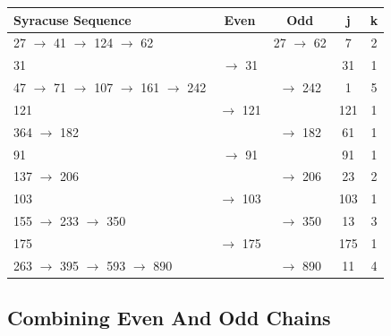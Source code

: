\documentclass[letterpaper]{article}
\begin{document}
\begin{multicols}{2}
    \noindent
    \begin{minipage}{\columnwidth}
        \setlength{\tabcolsep}{.35\tabcolsep}
        \centering
        \begin{tabular}{|l|c|c|c|c|}
            \hline
            \textbf{Syracuse Sequence}                      & \textbf{Even} & \textbf{Odd} & \textbf{j} & \textbf{k}  \\
            \hline
            27 $\to$ 41 $\to$ 124 $\to$ 62                  &               & 27 $\to$ 62  & 7          & 2           \\
            \hline
            31                                        & $\to$ 31      &              & 31         & 1               \\
            \hline
            47 $\to$ 71 $\to$ 107 $\to$ 161 $\to$ 242 &               & $\to$ 242    & 1          & 5            \\
            \hline
            121                                       & $\to$ 121     &              & 121        & 1           \\
            \hline
            364 $\to$ 182                             &               & $\to$ 182    & 61         & 1            \\
            \hline
            91                                        & $\to$ 91      &              & 91         & 1         \\
            \hline
            137 $\to$ 206                             &               & $\to$ 206    & 23         & 2              \\
            \hline
             103                                       & $\to$ 103     &              & 103        & 1             \\
            \hline
            155 $\to$ 233 $\to$ 350                   &               & $\to$ 350    & 13         & 3           \\
            \hline
            175                                       & $\to$ 175     &              & 175        & 1            \\
            \hline
            263 $\to$ 395 $\to$ 593 $\to$ 890         &               & $\to$ 890    & 11         & 4         \\
            \hline
        \end{tabular}
    \end{minipage}

    \subsection{Combining Even And Odd Chains}


\end{multicols}
\end{document}
